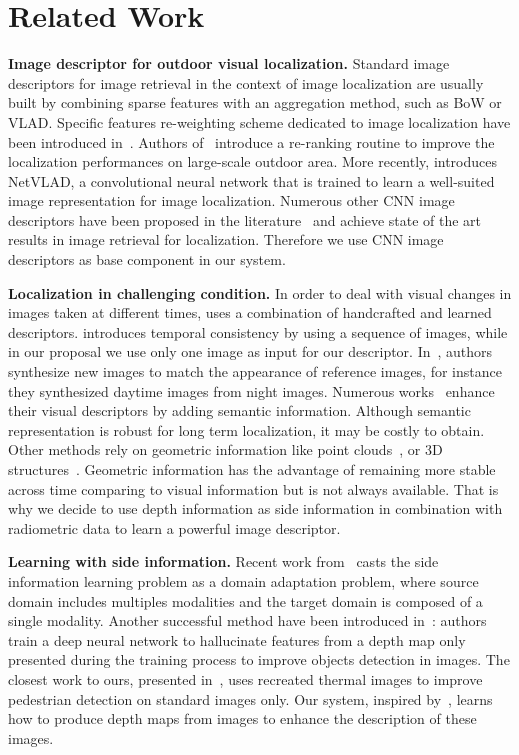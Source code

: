 
\section{Related Work}
\label{sec:related_work}

\vspace{4pt}\noindent\textbf{Image descriptor for outdoor visual localization.} Standard image descriptors for image retrieval in the context of image localization are usually built by combining sparse features with an aggregation method, such as BoW or VLAD. Specific features re-weighting scheme dedicated to image localization have been introduced in~\cite{Arandjelovic2014}. Authors of~\cite{Sattler2016} introduce a re-ranking routine to improve the localization performances on large-scale outdoor area. More recently, \cite{Arandjelovic2017} introduces NetVLAD, a convolutional neural network that is trained to learn a well-suited image representation for image localization. Numerous other CNN image descriptors have been proposed in the literature~\cite{Kim2017a,Gordo2017,Radenovic2017,Sunderhauf2015a,Liu2018} and achieve state of the art results in image retrieval for localization. Therefore we use CNN image descriptors as base component in our system.

\vspace{4pt}\noindent\textbf{Localization in challenging condition.} In order to deal with visual changes in images taken at different times, \cite{Naseer2018} uses a combination of handcrafted and learned descriptors. \cite{Garg2018} introduces temporal consistency by using a sequence of images, while in our proposal we use only one image as input for our descriptor. In~\cite{Porav2018}, authors synthesize new images to match the appearance of reference images, for instance they synthesized daytime images from night images. Numerous works~\cite{Stenborg2018,Toft2018,Naseer2017a} enhance their visual descriptors by adding semantic information. Although semantic representation is robust for long term localization, it may be costly to obtain. Other methods rely on geometric information like point clouds~\cite{Sattler2018,Schonberger2018}, or 3D structures~\cite{Torii2015}. Geometric information has the advantage of remaining more stable across time comparing to visual information but is not always available. That is why we decide to use depth information as side information in combination with radiometric data to learn a powerful image descriptor.

\vspace{4pt}\noindent\textbf{Learning with side information.} Recent work from~\cite{Li2017b} casts the side information learning problem as a domain adaptation problem, where source domain includes multiples modalities and the target domain is composed of a single modality. Another successful method have been introduced in~\cite{Hoffman2016}: authors train a deep neural network to hallucinate features from a depth map only presented during the training process to improve objects detection in images. The closest work to ours, presented in~\cite{xu2017learning}, uses recreated thermal images to improve pedestrian detection on standard images only. Our system, inspired by~\cite{xu2017learning}, learns how to produce depth maps from images to enhance the description of these images.
